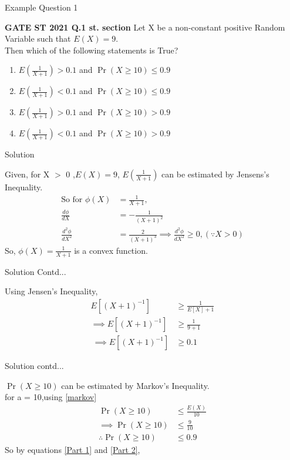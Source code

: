 \documentclass{beamer}
\providecommand{\pr}[1]{\ensuremath{\Pr\left(#1\right)}}
\begin{document}
\begin{frame}{Example Question 1}
\begin{block}{\textbf{GATE ST 2021 Q.1 st. section}}
Let X be a non-constant positive Random Variable such that $E(X) = 9$.\\
Then which of the following statements is True?
\begin{enumerate}
\item   $E(\frac{1}{X+1}) > 0.1$ and $\pr{X \ge 10} \le 0.9$
\item   $E(\frac{1}{X+1}) < 0.1$ and $\pr{X \ge 10} \le 0.9$
\item   $E(\frac{1}{X+1}) > 0.1$ and $\pr{X \ge 10} > 0.9$
\item   $E(\frac{1}{X+1}) < 0.1$ and $\pr{X \ge 10} > 0.9$
\end{enumerate}
\end{block}
\end{frame}
\begin{frame}{Solution}
\begin{block}{}
Given, for X $>$ 0 ,$E(X) = 9$, $E(\frac{1}{X+1})$ can be estimated by Jensens's Inequality.
\begin{align}
    \text{So for } \phi(X) &= \frac{1}{X+1}, \\
                \frac{d\phi}{dX} &= - \frac{1}{(X+1)^{2}} \\
                \frac{d^2 \phi}{dX^2} &= \frac{2}{(X+1)^{3}} 
    \implies \frac{d^2 \phi}{dX^2} \ge 0,(\because X>0 )
\end{align}
\centering So, $\phi(X) = \frac{1}{X+1}$ is a convex function.
\end{block}
\end{frame}
\begin{frame}{Solution Contd...}
\begin{block}{}
Using Jensen's Inequality,
\begin{align}
    E[(X+1)^{-1}] &\ge \frac{1}{E[X]+1} \\
    \implies E[(X+1)^{-1}] &\ge \frac{1}{9 + 1} \\\
    \label{Part 1}
    \implies E[(X+1)^{-1}] &\ge 0.1
\end{align}
\end{block}
\end{frame}
\begin{frame}{Solution contd...}
\begin{block}{}
$\pr{X \ge 10}$ can be estimated by Markov's Inequality. \\
for a = 10,using \eqref{markov}
\begin{align}
    \pr{X \ge 10} &\le \frac{E(X)}{10} \\
    \implies \pr{X \ge 10} &\le \frac{9}{10} \\
    \label{Part 2}
   \therefore \pr{X \ge 10} &\le 0.9
\end{align}
So by equations \eqref{Part 1} and \eqref{Part 2},
\begin{center}
\end{center}
\end{block}
\end{frame}
\end{document}
